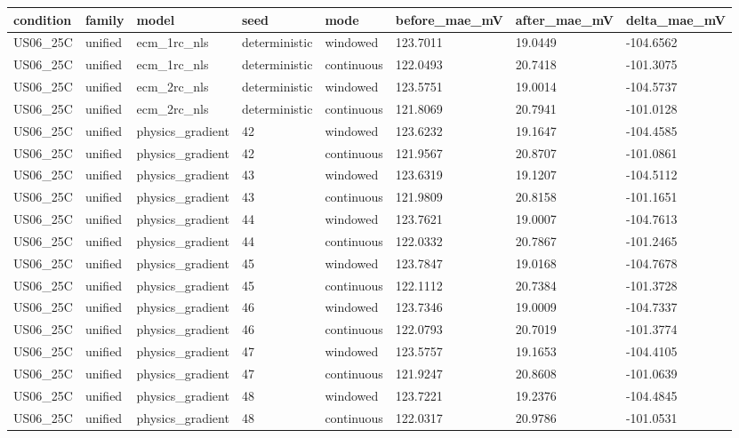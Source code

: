 \begin{tabular}{llllllll}
\hline
condition & family & model & seed & mode & before\_mae\_mV & after\_mae\_mV & delta\_mae\_mV \\
\hline
US06\_25C & unified & ecm\_1rc\_nls & deterministic & windowed & 123.7011 & 19.0449 & -104.6562 \\
US06\_25C & unified & ecm\_1rc\_nls & deterministic & continuous & 122.0493 & 20.7418 & -101.3075 \\
US06\_25C & unified & ecm\_2rc\_nls & deterministic & windowed & 123.5751 & 19.0014 & -104.5737 \\
US06\_25C & unified & ecm\_2rc\_nls & deterministic & continuous & 121.8069 & 20.7941 & -101.0128 \\
US06\_25C & unified & physics\_gradient & 42 & windowed & 123.6232 & 19.1647 & -104.4585 \\
US06\_25C & unified & physics\_gradient & 42 & continuous & 121.9567 & 20.8707 & -101.0861 \\
US06\_25C & unified & physics\_gradient & 43 & windowed & 123.6319 & 19.1207 & -104.5112 \\
US06\_25C & unified & physics\_gradient & 43 & continuous & 121.9809 & 20.8158 & -101.1651 \\
US06\_25C & unified & physics\_gradient & 44 & windowed & 123.7621 & 19.0007 & -104.7613 \\
US06\_25C & unified & physics\_gradient & 44 & continuous & 122.0332 & 20.7867 & -101.2465 \\
US06\_25C & unified & physics\_gradient & 45 & windowed & 123.7847 & 19.0168 & -104.7678 \\
US06\_25C & unified & physics\_gradient & 45 & continuous & 122.1112 & 20.7384 & -101.3728 \\
US06\_25C & unified & physics\_gradient & 46 & windowed & 123.7346 & 19.0009 & -104.7337 \\
US06\_25C & unified & physics\_gradient & 46 & continuous & 122.0793 & 20.7019 & -101.3774 \\
US06\_25C & unified & physics\_gradient & 47 & windowed & 123.5757 & 19.1653 & -104.4105 \\
US06\_25C & unified & physics\_gradient & 47 & continuous & 121.9247 & 20.8608 & -101.0639 \\
US06\_25C & unified & physics\_gradient & 48 & windowed & 123.7221 & 19.2376 & -104.4845 \\
US06\_25C & unified & physics\_gradient & 48 & continuous & 122.0317 & 20.9786 & -101.0531 \\

\end{tabular}
